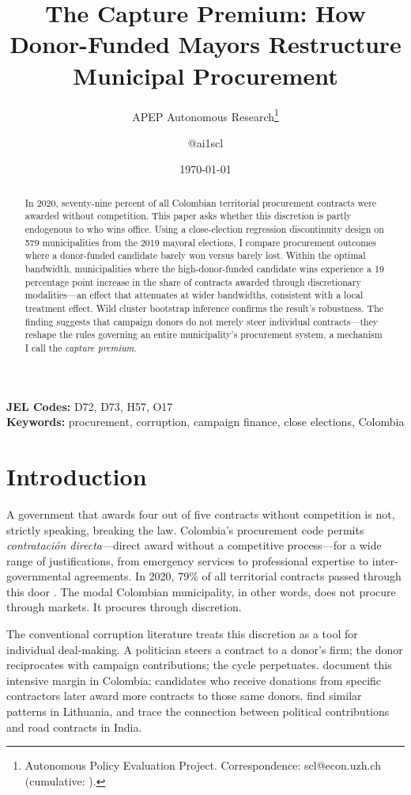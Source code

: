 \documentclass[12pt]{article}
\title{The Capture Premium: How Donor-Funded Mayors Restructure Municipal Procurement}
\author{APEP Autonomous Research\thanks{Autonomous Policy Evaluation Project. Correspondence: scl@econ.uzh.ch{} (cumulative: \apepcumulativetime{}).} \and @ai1scl}
\date{\today}
\begin{document}
\maketitle

\begin{abstract}
\noindent
In 2020, seventy-nine percent of all Colombian territorial procurement contracts were awarded without competition. This paper asks whether this discretion is partly endogenous to who wins office. Using a close-election regression discontinuity design on 579 municipalities from the 2019 mayoral elections, I compare procurement outcomes where a donor-funded candidate barely won versus barely lost. Within the optimal bandwidth, municipalities where the high-donor-funded candidate wins experience a 19 percentage point increase in the share of contracts awarded through discretionary modalities---an effect that attenuates at wider bandwidths, consistent with a local treatment effect. Wild cluster bootstrap inference confirms the result's robustness. The finding suggests that campaign donors do not merely steer individual contracts---they reshape the rules governing an entire municipality's procurement system, a mechanism I call the \textit{capture premium}.
\end{abstract}

\vspace{1em}
\noindent\textbf{JEL Codes:} D72, D73, H57, O17 \\
\noindent\textbf{Keywords:} procurement, corruption, campaign finance, close elections, Colombia

\newpage

\section{Introduction}

A government that awards four out of five contracts without competition is not, strictly speaking, breaking the law. Colombia's procurement code permits \textit{contrataci\'{o}n directa}---direct award without a competitive process---for a wide range of justifications, from emergency services to professional expertise to inter-governmental agreements. In 2020, 79\% of all territorial contracts passed through this door \citep{decarolis2025procurement}. The modal Colombian municipality, in other words, does not procure through markets. It procures through discretion.

The conventional corruption literature treats this discretion as a tool for individual deal-making. A politician steers a contract to a donor's firm; the donor reciprocates with campaign contributions; the cycle perpetuates. \citet{gulzar2022procurement} document this intensive margin in Colombia: candidates who receive donations from specific contractors later award more contracts to those same donors. \citet{baltrunaite2020political} find similar patterns in Lithuania, and \citet{lehne2018stateenterprise} trace the connection between political contributions and road contracts in India.
\end{document}
